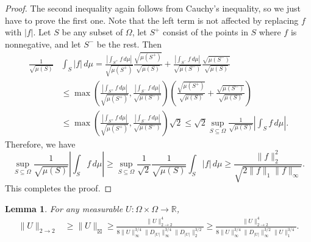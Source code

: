 \documentclass{amsart}
\numberwithin{equation}{section}
\numberwithin{figure}{section}
\newtheorem{lemma}[theorem]{Lemma}
\theoremstyle{definition}
\theoremstyle{remark}
\newcommand{\jbl}{{\boxtimes}}
\newcommand{\RR}{\mathbb{R}}
\begin{document}
\begin{proof}
The second inequality again follows from Cauchy's inequality, so we just have
to prove the first one. Note that the left term is not affected by replacing
$f$ with $|f|$. Let $S$ be any subset of $\Omega$, let $S^+$ consist of the
points in $S$ where $f$ is nonnegative, and let $S^-$ be the rest. Then
\begin{align*}
\frac{1}{\sqrt{\mu(S)}} &\int_{S}|f| \,d\mu
=\frac{\left|\int_{S^+} f \,d\mu \right|}{\sqrt{\mu(S^+)}} \frac{\sqrt{\mu(S^+)}}{\sqrt{\mu(S)}}
 + \frac{\left|\int_{S^-} f \,d\mu \right|}{\sqrt{\mu(S^-)}} \frac{\sqrt{\mu(S^-)}}{\sqrt{\mu(S)}} \\
&\le \max\left(\frac{\left|\int_{S^+} f \,d\mu \right|}{\sqrt{\mu(S^+)}} , \frac{\left|\int_{S^-} f \,d\mu \right|}{\sqrt{\mu(S^-)}}\right)\left(\frac{\sqrt{\mu(S^+)}}{\sqrt{\mu(S)}}+ \frac{\sqrt{\mu(S^-)}}{\sqrt{\mu(S)}}\right)\\
&\le \max\left(\frac{\left|\int_{S^+} f \,d\mu \right|}{\sqrt{\mu(S^+)}} , \frac{\left|\int_{S^-} f \,d\mu \right|}{\sqrt{\mu(S^-)}}\right) \sqrt{2}
\leq\sqrt 2 \sup_{S \subseteq \Omega}
\frac{1}{\sqrt{\mu(S)}} \left|\int_{S}f \,d\mu \right|
.
\end{align*}
Therefore, we have
\[ \sup_{S \subseteq \Omega} \frac{1}{\sqrt{\mu(S)}} \left|\int_{S}f \,d\mu \right|
\ge \sup_{S \subseteq \Omega} \frac{1}{\sqrt{2}} \frac{1}{\sqrt{\mu(S)}} \int_{S}|f| \,d\mu \ge \frac{\|f\|_2^2}{\sqrt{2\|f\|_1\|f\|_\infty}}.
\]
This completes the proof.
\end{proof}

\begin{lemma} \label{lemmasquare2to2equiv}
For any measurable $U\colon\Omega \times \Omega \rightarrow \RR$,
\begin{align*}
\|U\|_{2 \rightarrow 2}
&\ge \|U\|_{\jbl}
\ge \frac{\|U\|_{2 \rightarrow 2}^4}{8\|U\|_\infty^{3/4}\|D_{|U|}\|_\infty^{3/4}\|D_{|U|}\|_2^{3/2}}
\ge \frac{\|U\|_{2 \rightarrow2}^4}{8\|U\|_\infty^{3/4}\|D_{|U|}\|_\infty^{3/2}\|U\|_1^{3/4}}.
\end{align*}
\end{lemma}
\end{document}
